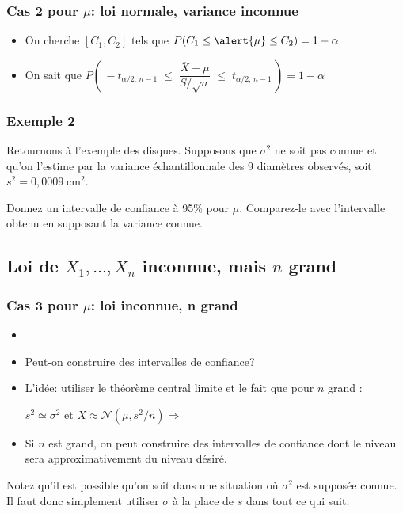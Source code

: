\documentclass{BeamerTemplate}
\begin{document}
\begin{frame}[t]
 \frametitle{Cas 2 pour $\mu$: loi normale, variance inconnue}

 \begin{itemize} \itemsep3mm
\item On cherche $[C_1, C_2]$ tels que $P(C_1\le \alert{\mu} \le C_2)=1-\alpha$
\item On sait que $P\left(\,-t_{\alpha/2;\, n-1}\;\le \;\dfrac{\overline X - \mu}{S/\sqrt{n}}\;\le \;t_{\alpha/2;\, n-1}\,\right)=1-\alpha$
\end{itemize}

\end{frame}

\begin{frame}[t]
 \frametitle{Exemple 2}
 Retournons à l'exemple des disques. Supposons que $\sigma^2$ ne soit pas
 connue et qu'on l'estime par la variance échantil\-lonnale des 9 diamètres observés, soit $s^2= 0,0009 \;\text{cm}^2$.

 \vspace{3mm}

 Donnez un intervalle de confiance à 95\% pour $\mu$. Comparez-le avec l'intervalle obtenu en supposant la variance connue.
\end{frame}

\subsection{Loi de $X_1,\ldots,X_n$ inconnue, mais $n$ grand}

\begin{frame}[t]
 \frametitle{Cas 3 pour $\mu$: loi inconnue, n grand}

 \begin{itemize} \itemsep3mm
\item {\color{blue}{On suppose que $X_1,\ldots,X_n$ sont i.i.d. d'une loi inconnue. }}%
\item  Peut-on construire des intervalles de confiance?

 \item L'idée: utiliser le \alert{théorème  central limite } et le fait  que pour $n$ grand :%

 \vspace{4mm}
  $s^2\simeq \sigma^2$ et $\overline{X}\approx \mathcal{N}(\mu,s^2/n)\Rightarrow$
\vspace{1cm}
\item 
 Si $n$ est grand, on peut construire des intervalles de confiance dont le niveau sera \alert{approximativement}  du niveau désiré.
\end{itemize}

{\small
Notez qu'il est possible qu'on soit dans une situation où $\sigma^2$ est supposée connue. Il faut donc simplement utiliser $\sigma$ à la place de $s$ dans tout ce qui suit.}
\end{frame}
\end{document}
